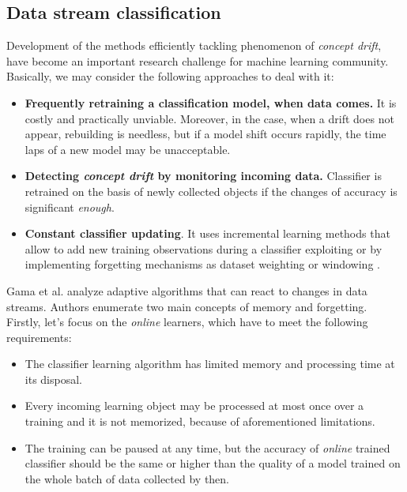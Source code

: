 \subsection{Data stream classification}

\noindent Development of the methods efficiently tackling phenomenon of \emph{concept drift}, have become an important research challenge for machine learning community. Basically, we may consider the following approaches to deal with it:

\begin{itemize}
	\item \textbf{Frequently retraining a classification model, when data comes.} It is costly and practically unviable. Moreover, in the case, when a drift does not appear, rebuilding is needless, but if a model shift occurs rapidly, the time laps of a new model may be unacceptable.
	\item \textbf{Detecting \emph{concept drift} by monitoring incoming data.} Classifier is retrained on the basis of newly collected objects if the changes of accuracy is significant \emph{enough}.
	\item \textbf{Constant classifier updating}. It uses incremental learning methods that allow to add new training observations during a classifier exploiting or by implementing forgetting mechanisms as dataset weighting or windowing \cite{Gama:2014}.
\end{itemize}

Gama et al. \cite{Gama:2014} analyze adaptive algorithms that can react to changes in data streams. Authors enumerate two main concepts of memory and forgetting. Firstly, let's focus on the \emph{online} learners\cite{Domingos:2003}, which have to meet the following requirements:

\begin{itemize}
	\item The classifier learning algorithm has limited memory and processing time at its disposal.%
    
    \item Every incoming learning object may be processed at most once over a training and it is not memorized, because of aforementioned limitations.
    
		\item The training can be paused at any time, but the accuracy of \emph{online} trained classifier should be the same or higher than the quality of a model trained on the whole batch of data collected by then.
\end{itemize}

